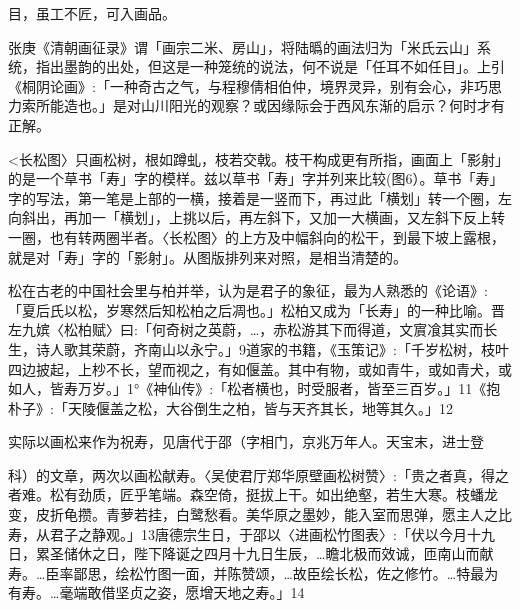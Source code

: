 
\noindent 目，虽工不匠，可入画品。

张庚《清朝画征录》谓「画宗二米、房山」，将陆㬙的画法归为「米氏云山」系统，指出墨韵的出处，但这是一种笼统的说法，何不说是「任耳不如任目」。上引《桐阴论画》:「一种奇古之气，与程穆倩相伯仲，境界灵异，别有会心，非巧思力索所能造也。」是对山川阳光的观察？或因缘际会于西风东渐的启示？何时才有正解。


<长松图〉只画松树，根如蹲虬，枝若交戟。枝干构成更有所指，画面上「影射」的是一个草书「寿」字的模样。兹以草书「寿」字并列来比较(图6）。草书「寿」字的写法，第一笔是上部的一横，接着是一竖而下，再过此「横划」转一个圈，左向斜出，再加一「横划」，上挑以后，再左斜下，又加一大横画，又左斜下反上转一圈，也有转两圈半者。〈长松图〉的上方及中幅斜向的松干，到最下坡上露根，就是对「寿」字的「影射」。从图版排列来对照，是相当清楚的。

松在古老的中国社会里与柏并举，认为是君子的象征，最为人熟悉的《论语》:「夏后氏以松，岁寒然后知松柏之后凋也。」松柏又成为「长寿」的一种比喻。晋左九嫔〈松柏赋〉曰:「何奇树之英蔚，…，赤松游其下而得道，文賔飡其实而长生，诗人歌其荣蔚，齐南山以永宁。」9道家的书籍，《玉策记》:「千岁松树，枝叶四边披起，上杪不长，望而视之，有如偃盖。其中有物，或如青牛，或如青犬，或如人，皆寿万岁。」1°《神仙传》:「松者横也，时受服者，皆至三百岁。」11《抱朴子》:「天陵偃盖之松，大谷倒生之柏，皆与天齐其长，地等其久。」12

实际以画松来作为祝寿，见唐代于邵（字相门，京兆万年人。天宝末，进士登

\vfill
\begin{BookNotes}
\end{BookNotes}


\noindent 科）的文章，两次以画松献寿。〈吴使君厅郑华原壁画松树赞〉:「贵之者真，得之者难。松有劲质，匠乎笔端。森空倚，挺拔上干。如出绝壑，若生大寒。枝蟠龙变，皮折龟攒。青萝若挂，白鹭愁看。美华原之墨妙，能入室而思弹，愿主人之比寿，从君子之静观。」13唐德宗生日，于邵以〈进画松竹图表〉:「伏以今月十九日，累圣储休之日，陛下降诞之四月十九日生辰，…瞻北极而效诚，匝南山而献寿。…臣率鄙思，绘松竹图一面，并陈赞颂，…故臣绘长松，佐之修竹。…特最为有寿。…毫端敢借坚贞之姿，愿增天地之寿。」14

